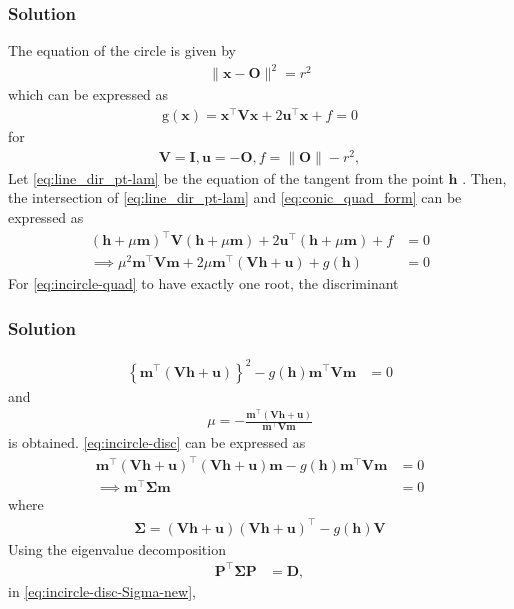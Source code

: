 \documentclass{beamer}
\providecommand{\brak}[1]{\ensuremath{\left(#1\right)}}
\providecommand{\cbrak}[1]{\ensuremath{\left\{#1\right\}}}
\theoremstyle{remark}
\providecommand{\norm}[1]{\lVert#1\rVert}
\let\vec\mathbf
\begin{document}
\begin{frame}
\frametitle{Solution}
	The equation of the circle is given by 
		\begin{align}
			\label{eq:incircle}
			\norm{\vec{x}-\vec{O}}^2 = r^2
		\end{align}
		which can be expressed as 
\begin{align}
    \label{eq:conic_quad_form}
	\text{g}\brak{\vec{x}} = \vec{x}^{\top}\vec{V}\vec{x}+2\vec{u}^{\top}\vec{x}+f=0
    \end{align}
for
		\begin{align}
			 \label{eq:conic_quad_form-params}
	 \vec{V}=\vec{I},\vec{u}=-\vec{O}, f = \norm{\vec{O}}-r^2,
		\end{align}
Let 
  \eqref{eq:line_dir_pt-lam}
  be the equation of the tangent from the point $\vec{h}$ .  Then, the intersection of 
  \eqref{eq:line_dir_pt-lam}
  and 
			 \eqref{eq:conic_quad_form}
			 can be expressed as 
\begin{align}
\brak{\vec{h} + \mu{\vec{m}}}^{\top}
\vec{V}
\brak{\vec{h} + \mu{\vec{m}}}
			+2\vec{u}^{\top}\brak{\vec{h} + \mu{\vec{m}}}+f &= 0
			\\
\implies \mu^2\vec{m}^{\top} \vec{V}\vec{m} + 2\mu \vec{m}^{\top}\brak{\vec{V}\vec{h}+\vec{u}}+g\brak{\vec{h}} &= 0 
	\label{eq:incircle-quad}
\end{align}
For 	\eqref{eq:incircle-quad} to have exactly one root, the discriminant
\end{frame}
\begin{frame}
\frametitle{Solution}
\begin{align}
 \cbrak{\vec{m}^{\top}\brak{\vec{V}\vec{h}+\vec{u}}}^2 -g\brak{\vec{h}}\vec{m}^{\top} \vec{V}\vec{m}  &= 0 
	\label{eq:incircle-disc}
\end{align}
and 
  \begin{align}
  \label{eq:line_dir_pt-lam-mu}
	  \mu = -\frac{\vec{m}^{\top}\brak{\vec{V}\vec{h}+\vec{u}}}{\vec{m}^{\top}\vec{V}\vec{m} }
  \end{align}
  is obtained.
	\eqref{eq:incircle-disc}
	can be expressed as
\begin{align}
\vec{m}^{\top}\brak{\vec{V}\vec{h}+\vec{u}}^{\top}\brak{\vec{V}\vec{h}+\vec{u}}\vec{m}-g\brak{\vec{h}}\vec{m}^{\top} \vec{V}\vec{m}  &= 0 
\\
\implies \vec{m}^{\top}\vec{\Sigma}\vec{m} &= 0
	\label{eq:incircle-disc-Sigma-new}
\end{align}
where
\begin{align}
	\label{eq:incircle-disc-Sigma}
\vec{\Sigma} = 
\brak{\vec{V}\vec{h}+\vec{u}}
	  \brak{\vec{V}\vec{h}+\vec{u}}^{\top}
   -
	  {g}\brak{\vec{h}}\vec{V}
\end{align}
Using the eigenvalue decomposition
    \begin{align}
      \label{eq:conic_parmas_eig_def}
      \vec{P}^{\top}\vec{\Sigma}\vec{P} &= \vec{D},
    \end{align} 
	in \eqref{eq:incircle-disc-Sigma-new},
\end{frame}
\end{document}
